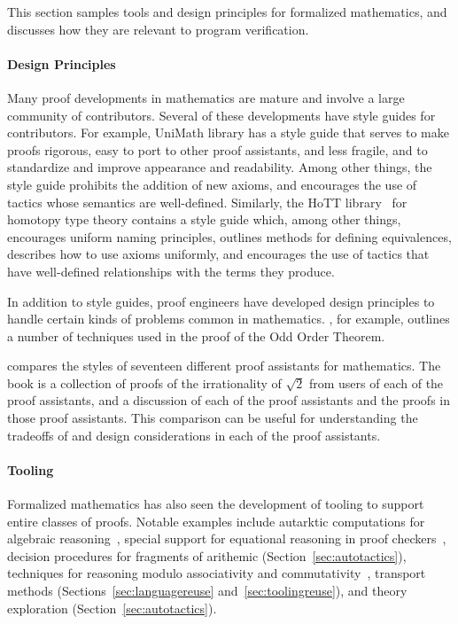 This section samples tools and design principles for formalized mathematics,
and discusses how they are relevant to program verification.

\paragraph{Design Principles} Many proof developments in mathematics are mature and
involve a large community of contributors. Several of these developments have 
style guides for contributors.
For example, UniMath library has a style guide
that serves to make proofs rigorous, easy to
port to other proof assistants, and less fragile, and to standardize
and improve appearance and readability. Among other things, the style
guide prohibits the addition of new axioms, and encourages the use of
tactics whose semantics are well-defined.  Similarly, the HoTT
library~\citep{Bauer2017} for homotopy type theory contains a style
guide which, among other things, encourages uniform naming principles, outlines methods for
defining equivalences, describes how to use axioms uniformly,
and encourages the use of tactics that have well-defined relationships
with the terms they produce. 

In addition to style guides, proof engineers have developed design principles to handle certain kinds of problems
common in mathematics. \cite{Gonthier2013}, for example, outlines
a number of techniques used in the proof of the Odd Order Theorem.

\cite{Wiedijk2006} compares the styles
of seventeen different proof assistants for mathematics. The book is a collection of
proofs of the irrationality of $\sqrt{2}$ from users of each of the proof assistants,
and a discussion of each of the proof assistants and the proofs in those proof assistants.
This comparison can be useful for understanding the tradeoffs of and design considerations in each of the proof assistants.

\paragraph{Tooling} Formalized mathematics has also seen the development of tooling
to support entire classes of proofs. Notable examples include autarktic
computations for algebraic reasoning~\citep{Barendregt2002}, special support
for equational reasoning in proof checkers~\citep{Barthe1996}, 
decision procedures for fragments of arithemic (Section~\ref{sec:autotactics}),
techniques for reasoning modulo associativity and commutativity~\citep{Braibant2011},
transport methods (Sections~\ref{sec:languagereuse} and~\ref{sec:toolingreuse}),
and theory exploration (Section~\ref{sec:autotactics}).

